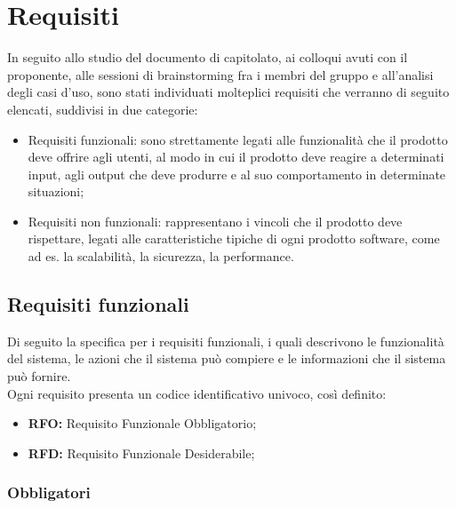 \section{Requisiti}

In seguito allo studio del documento di capitolato, ai colloqui avuti con il proponente, alle sessioni di
brainstorming fra i membri del gruppo e all'analisi degli casi d'uso, sono stati individuati molteplici requisiti
che verranno di seguito elencati, suddivisi in due categorie:

\begin{itemize}
    \item Requisiti funzionali: sono strettamente legati alle funzionalità che il prodotto deve offrire agli utenti,
    al modo in cui il prodotto deve reagire a determinati input, agli output che deve produrre e al suo comportamento in determinate situazioni;
    \item Requisiti non funzionali: rappresentano i vincoli che il prodotto deve rispettare, legati alle caratteristiche tipiche di
    ogni prodotto software, come ad es. la scalabilità, la sicurezza, la performance.
\end{itemize}

\subsection{Requisiti funzionali}

Di seguito la specifica per i requisiti funzionali, i quali descrivono le funzionalità del sistema, le azioni che il sistema può compiere e le informazioni che il sistema può fornire.\\
Ogni requisito presenta un codice identificativo univoco, così definito:
\begin{itemize}
    \item \textbf{RFO:} Requisito Funzionale Obbligatorio;
    \item \textbf{RFD:} Requisito Funzionale Desiderabile;
\end{itemize}

\subsubsection{Obbligatori}

